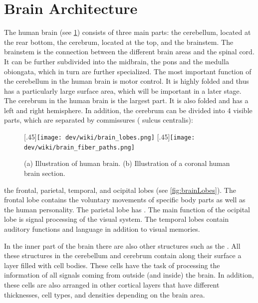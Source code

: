 \section{Brain Architecture}
% 
The human brain (see \cref{fig:humanBrain}) consists of three main parts: the cerebellum, located at the rear bottom, the cerebrum, located at the top, and the brainstem.
The brainstem is the connection between the different brain areas and the spinal cord.
It can be further subdivided into the midbrain, the pons and the medulla obiongata, which in turn are further specialized.
The most important function of the cerebellum in the human brain is motor control.
It is highly folded and thus has a particularly large surface area, which will be important in a later stage.
\\
% 
The cerebrum in the human brain is the largest part.
It is also folded and has a left and right hemisphere.
In addition, the cerebrum can be divided into 4 visible parts, which are separated by commissures (\eg{} sulcus centralis):
% 
\begin{figure}[!t]
\centering
\hspace*{\fill}
[.45\textwidth]{\texttt{[image: dev/wiki/brain\_lobes.png]}}
\hspace*{\fill}
[.45\textwidth]{\texttt{[image: dev/wiki/brain\_fiber\_paths.png]}}
\hspace*{\fill}
\caption{(a) Illustration of human brain. (b) Illustration of a coronal human brain section. }
\label{fig:humanBrain}
\end{figure}
% 
the frontal, parietal, temporal, and ocipital lobes (see \cref{fig:brainLobes}).
The frontal lobe contains the voluntary movements of specific body parts as well as the human personality.
The parietal lobe has \dummy{}.
The main function of the ocipital lobe is signal processing of the visual system.
The temporal lobes contain auditory functions and language in addition to visual memories.
\par
% 
In the inner part of the brain there are also other structures such as the \dummy{}.
All these structures in the cerebellum and cerebrum contain along their surface a layer filled with cell bodies.
These cells have the task of processing the information of all signals coming from outside (and inside) the brain.
In addition, these cells are also arranged in other cortical layers that have different thicknesses, cell types, and densities depending on the brain area.
